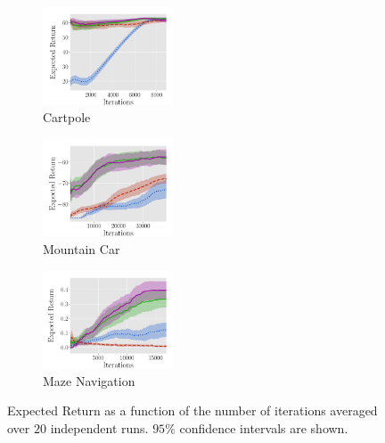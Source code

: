 \documentclass{article}
\begin{document}
\begin{figure}[t]
	\begin{subfigure}[b]{0.32\textwidth}
    \includegraphics[trim=0.0cm 0cm 1.2cm 1.3cm,clip=true,height=2.9cm]{images/cartpole/lrev.pdf}
    \caption{Cartpole}\label{f:cartpole}
  \end{subfigure}
    \begin{subfigure}[b]{0.32\textwidth}
    \includegraphics[trim=0.0cm 0cm 1.2cm 1.3cm,clip=true,height=2.9cm]{images/mountaincar/lrev.pdf}
    \caption{Mountain Car}\label{f:mountaincar}
  \end{subfigure}
    \begin{subfigure}[b]{0.32\textwidth}
    \includegraphics[trim=0.0cm 0cm 1.2cm 1.3cm,clip=true,height=2.9cm]{images/maze/lrev_main.pdf}
    \caption{Maze Navigation}\label{f:maze_results}
  \end{subfigure}
  \caption{Expected Return as a function of the number of iterations averaged over $20$ independent runs. $95\%$ confidence intervals are shown.}
  \label{fig:ccmazeplots}

  \label{fig:dipfdbsgraphplots}
\end{figure}
\end{document}
